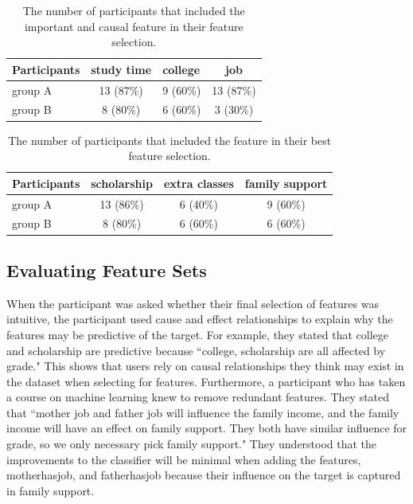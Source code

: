 \begin{table}[]
\centering
\begin{tabular}{lccc}
\hline
Participants & \multicolumn{1}{l}{study time} & \multicolumn{1}{l}{college} & job \\ \hline
group A      & 13 (87\%)                      &  9  (60\%) & 13 (87\%)               \\
group B      & 8 (80\%)                       &  6  (60\%) & 3  (30\%)          \\ \hline
\end{tabular}
\caption{The number of participants that included the important and causal feature in their feature selection.}
\label{RelevantFSBasedOnImportance}
\end{table}

\begin{table}[]
\centering
\begin{tabular}{lccc}
\hline
Participants & \multicolumn{1}{l}{scholarship} & \multicolumn{1}{l}{extra classes} & \multicolumn{1}{l}{family support} \\ \hline
group A      & 13 (86\%)   & 6 (40\%)  & 9 (60\%)  \\
group B      & 8 (80\%)     & 6 (60\%)  & 6 (60\%)  \\ \hline
\end{tabular}
\caption{The number of participants that included the feature in their best feature selection.}
\label{RevelantFSBasedOnCausal}
\end{table}

\subsection{Evaluating Feature Sets}
When the participant was asked whether their final selection of features was intuitive, the participant used cause and effect relationships to explain why the features may be predictive of the target. For example, they stated that college and scholarship are predictive because ``college, scholarship are all affected by grade." This shows that users rely on causal relationships they think may exist in the dataset when selecting for features. Furthermore, a participant who has taken a course on machine learning knew to remove redundant features. They stated that ``mother job and father job will influence the family income, and the family income will have an effect on family support. They both have similar influence for grade, so we only necessary pick family support." They understood that the improvements to the classifier will be minimal when adding the features, motherhasjob, and fatherhasjob because their influence on the target is captured in family support.


